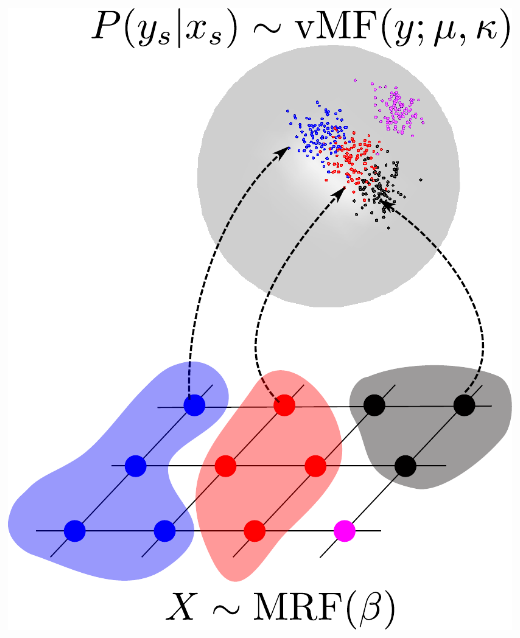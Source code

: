 \documentclass[sansserif, 10pt]{beamer}
\begin{document}
\begin{frame}
\begin{columns}
  \begin{column}{0.4\textwidth}
    \includegraphics[width=1\textwidth]{sfig/genevmf}
  \end{column}
\end{columns}
\end{frame}
\end{document}
